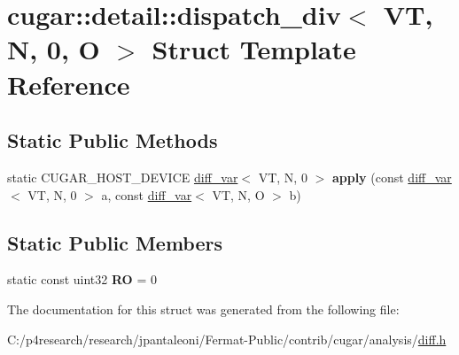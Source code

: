 \hypertarget{structcugar_1_1detail_1_1dispatch__div_3_01_v_t_00_01_n_00_010_00_01_o_01_4}{}\section{cugar\+:\+:detail\+:\+:dispatch\+\_\+div$<$ VT, N, 0, O $>$ Struct Template Reference}
\label{structcugar_1_1detail_1_1dispatch__div_3_01_v_t_00_01_n_00_010_00_01_o_01_4}
\subsection*{Static Public Methods}
\begin{DoxyCompactItemize}
\item 
\mbox{\label{structcugar_1_1detail_1_1dispatch__div_3_01_v_t_00_01_n_00_010_00_01_o_01_4_a111b430aa95f8b2cd88085329823e7db}} 
static C\+U\+G\+A\+R\+\_\+\+H\+O\+S\+T\+\_\+\+D\+E\+V\+I\+CE \hyperlink{structcugar_1_1diff__var}{diff\+\_\+var}$<$ VT, N, 0 $>$ {\bfseries apply} (const \hyperlink{structcugar_1_1diff__var}{diff\+\_\+var}$<$ VT, N, 0 $>$ a, const \hyperlink{structcugar_1_1diff__var}{diff\+\_\+var}$<$ VT, N, O $>$ b)
\end{DoxyCompactItemize}
\subsection*{Static Public Members}
\begin{DoxyCompactItemize}
\item 
\mbox{\label{structcugar_1_1detail_1_1dispatch__div_3_01_v_t_00_01_n_00_010_00_01_o_01_4_a9bfc8b7f723f1e19b9d420eb2f6644fd}} 
static const uint32 {\bfseries RO} = 0
\end{DoxyCompactItemize}


The documentation for this struct was generated from the following file\+:\begin{DoxyCompactItemize}
\item 
C\+:/p4research/research/jpantaleoni/\+Fermat-\/\+Public/contrib/cugar/analysis/\hyperlink{diff_8h}{diff.\+h}\end{DoxyCompactItemize}
